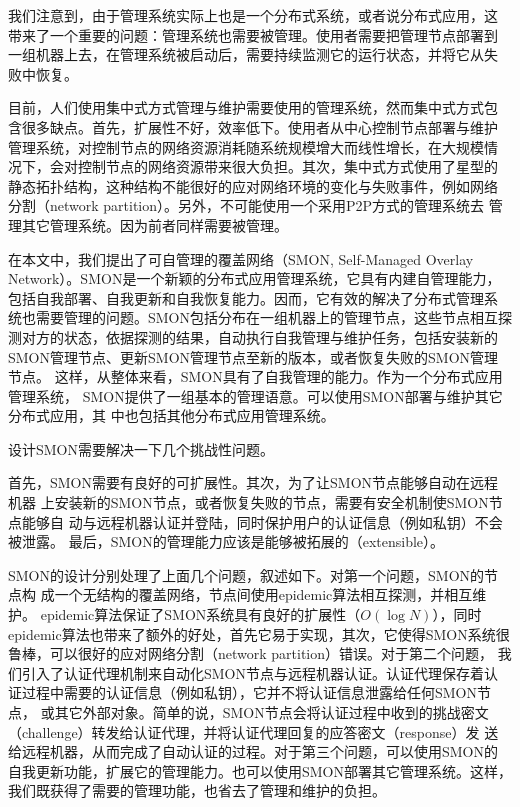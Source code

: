 我们注意到，由于管理系统实际上也是一个分布式系统，或者说分布式应用，这
带来了一个重要的问题：管理系统也需要被管理。使用者需要把管理节点部署到
一组机器上去，在管理系统被启动后，需要持续监测它的运行状态，并将它从失
败中恢复。%

目前，人们使用集中式方式管理与维护需要使用的管理系统，然而集中式方式包
含很多缺点。首先，扩展性不好，效率低下。使用者从中心控制节点部署与维护
管理系统，对控制节点的网络资源消耗随系统规模增大而线性增长，在大规模情
况下，会对控制节点的网络资源带来很大负担。其次，集中式方式使用了星型的
静态拓扑结构，这种结构不能很好的应对网络环境的变化与失败事件，例如网络
分割（network partition）。另外，不可能使用一个采用P2P方式的管理系统去
管理其它管理系统。因为前者同样需要被管理。

在本文中，我们提出了可自管理的覆盖网络（SMON, Self-Managed Overlay
Network）。SMON是一个新颖的分布式应用管理系统，它具有内建自管理能力，
包括自我部署、自我更新和自我恢复能力。因而，它有效的解决了分布式管理系
统也需要管理的问题。SMON包括分布在一组机器上的管理节点，这些节点相互探
测对方的状态，依据探测的结果，自动执行自我管理与维护任务，包括安装新的
SMON管理节点、更新SMON管理节点至新的版本，或者恢复失败的SMON管理节点。
这样，从整体来看，SMON具有了自我管理的能力。作为一个分布式应用管理系统，
SMON提供了一组基本的管理语意。可以使用SMON部署与维护其它分布式应用，其
中也包括其他分布式应用管理系统。

设计SMON需要解决一下几个挑战性问题。

首先，SMON需要有良好的可扩展性。其次，为了让SMON节点能够自动在远程机器
上安装新的SMON节点，或者恢复失败的节点，需要有安全机制使SMON节点能够自
动与远程机器认证并登陆，同时保护用户的认证信息（例如私钥）不会被泄露。
最后，SMON的管理能力应该是能够被拓展的（extensible）。

SMON的设计分别处理了上面几个问题，叙述如下。对第一个问题，SMON的节点构
成一个无结构的覆盖网络，节点间使用epidemic算法相互探测，并相互维护。
epidemic算法保证了SMON系统具有良好的扩展性（$O(\log N)$），同时
epidemic算法也带来了额外的好处，首先它易于实现，其次，它使得SMON系统很
鲁棒，可以很好的应对网络分割（network partition）错误。对于第二个问题，
我们引入了认证代理机制来自动化SMON节点与远程机器认证。认证代理保存着认
证过程中需要的认证信息（例如私钥），它并不将认证信息泄露给任何SMON节点，
或其它外部对象。简单的说，SMON节点会将认证过程中收到的挑战密文
（challenge）转发给认证代理，并将认证代理回复的应答密文（response）发
送给远程机器，从而完成了自动认证的过程。对于第三个问题，可以使用SMON的
自我更新功能，扩展它的管理能力。也可以使用SMON部署其它管理系统。这样，
我们既获得了需要的管理功能，也省去了管理和维护的负担。

